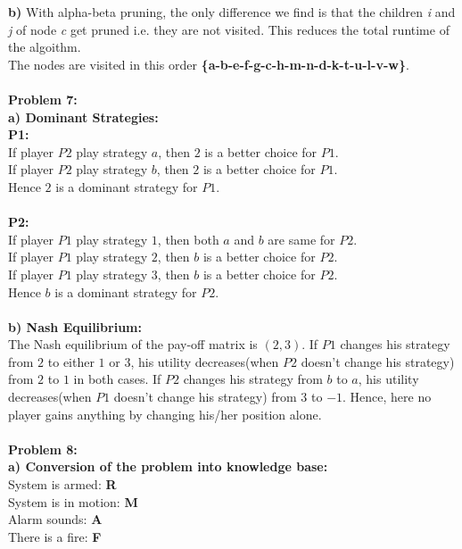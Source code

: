 {\bf b)} With alpha-beta pruning, the only difference we find is that the children {\it i} and {\it j} of node {\it c} get pruned i.e. they are not visited. This reduces the total runtime of the algoithm.\\
The nodes are visited in this order  {\bf \{a-b-e-f-g-c-h-m-n-d-k-t-u-l-v-w\}}.\\ \\

{\bf Problem 7:}\\
{\bf a) Dominant Strategies:}\\
{\bf P1:}\\
If player $P2$ play strategy $a$, then $2$ is a better choice for $P1$.\\
If player $P2$ play strategy $b$, then $2$ is a better choice for $P1$. \\
Hence $2$ is a dominant strategy for $P1$.\\ \\

{\bf P2:}\\
If player $P1$ play strategy $1$, then both $a$ and $b$ are same for $P2$.\\
If player $P1$ play strategy $2$, then $b$ is a better choice for $P2$. \\
If player $P1$ play strategy $3$, then $b$ is a better choice for $P2$. \\
Hence $b$ is a dominant strategy for $P2$.\\ \\

{\bf b) Nash Equilibrium:}\\
The Nash equilibrium of the pay-off matrix is $(2, 3)$. If $P1$ changes his strategy from $2$ to either $1$ or $3$, his utility decreases(when $P2$ doesn't change his strategy) from $2$ to $1$ in both cases. If $P2$ changes his strategy from $b$ to $a$, his utility decreases(when $P1$ doesn't change his strategy) from $3$ to $-1$. Hence, here no player gains anything by changing his/her position alone.\\ \\

{\bf Problem 8:}\\
{\bf a) Conversion of the problem into knowledge base:}\\
System is armed: {\bf R}\\
System is in motion: {\bf M}\\
Alarm sounds: {\bf A}\\
There is a fire: {\bf F}\\ \\

